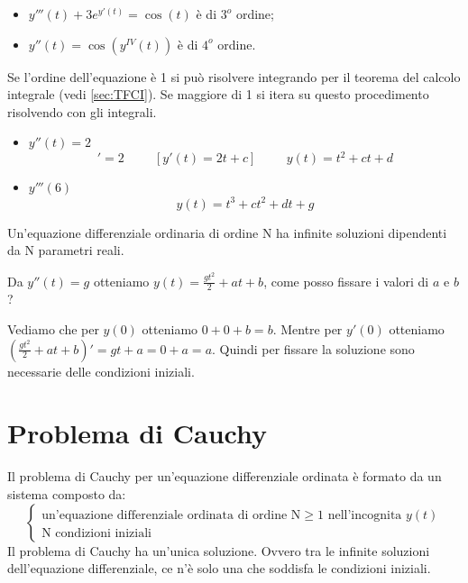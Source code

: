 \begin{example}\phantom{}
\begin{itemize}
    \item $y'''(t)+3e^{y'(t)}=\cos(t)$ è di $3^o$ ordine;
    \item $y''(t)=\cos(y^{IV}(t))$ è di $4^o$ ordine.
\end{itemize}
\end{example}

Se l'ordine dell'equazione è 1 si può risolvere integrando per il teorema del calcolo integrale (vedi \ref{sec:TFCI}). Se maggiore di 1 si itera su questo procedimento risolvendo con gli integrali.

\begin{example}\phantom{}
\begin{itemize}
    \item $y''(t)=2$\begin{equation*}[y'(t)]'=2\hspace{1cm} [y'(t)=2t+c]\hspace{1cm}y(t)=t^2+ct+d\end{equation*}
    \item $y'''(6)$\begin{equation*}y(t)=t^3+ct^2+dt+g\end{equation*}
\end{itemize}
\end{example}

Un'equazione differenziale ordinaria di ordine N ha infinite soluzioni dipendenti da N parametri reali.

\begin{osservation*}
    Da $y''(t)=g$ otteniamo $y(t)=\frac{gt^2}{2}+at+b$, come posso fissare i valori di $a$ e $b$?
    
    Vediamo che per $y(0)$ otteniamo $0+0+b=b$. Mentre per $y'(0)$ otteniamo $(\frac{gt^2}{2}+at+b)'=gt+a=0+a=a$. Quindi per fissare la soluzione sono necessarie delle condizioni iniziali.
\end{osservation*}

\section{Problema di Cauchy}
\begin{thm}
Il problema di Cauchy per un'equazione differenziale ordinata è formato da un sistema composto da:
$$\begin{cases}\text{un'equazione differenziale ordinata di ordine N}\geq1\text{ nell'incognita }y(t)\\\text{N condizioni iniziali}\end{cases}$$
Il problema di Cauchy ha un'unica soluzione. Ovvero tra le infinite soluzioni dell'equazione differenziale, ce n'è solo una che soddisfa le condizioni iniziali.
\end{thm}

